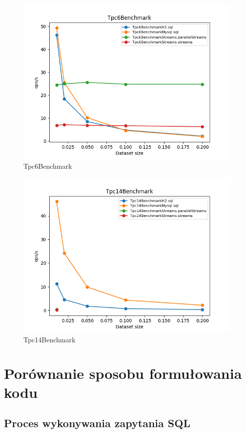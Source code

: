 \documentclass[12pt]{extarticle}
\begin{document}
\begin{figure}[H]
\centering
\includegraphics[width=13cm]{plots/Tpc6Benchmark}
\caption{Tpc6Benchmark}
\end{figure}

\begin{figure}[H]
\centering
\includegraphics[width=13cm]{plots/Tpc14Benchmark}
\caption{Tpc14Benchmark}
\end{figure}


\section{Porównanie sposobu formułowania kodu}

\subsection{Proces wykonywania zapytania SQL}
\end{document}
